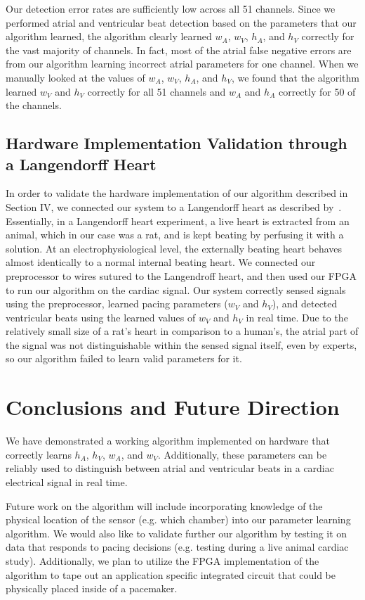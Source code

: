 \documentclass[conference]{IEEEtran}
\newcommand{\APW}{\ensuremath{w_A}}
\newcommand{\VPW}{\ensuremath{w_V}}
\newcommand{\APH}{\ensuremath{h_A}}
\newcommand{\VPH}{\ensuremath{h_V}}
\begin{document}
Our detection error rates are sufficiently low across 
all 51 channels. Since we performed atrial and
ventricular beat detection based on the parameters that
our algorithm learned, the algorithm clearly learned
\APW{}, \VPW{}, \APH{}, and \VPH{} correctly for the vast
majority of channels. In fact, most of the atrial false negative
errors are from our algorithm learning incorrect
atrial parameters for one channel. When we manually
looked at the values of \APW{}, \VPW{}, \APH{}, and \VPH{}, we
found that the algorithm learned \VPW{} and \VPH{} correctly
for all 51 channels and \APW{} and \APH{} correctly for 50 of 
the channels.

\subsection{Hardware Implementation Validation through a Langendorff Heart}
In order to validate the hardware implementation of
our algorithm described in Section IV, we connected our 
system to a Langendorff heart as described by~\cite{langendorff}.
Essentially, in a Langendorff heart experiment, a live
heart is extracted from an animal, which in our case was
a rat, and is kept beating by perfusing it with a solution. 
At an electrophysiological level, the externally beating heart behaves almost identically to a normal internal beating heart.
We connected our preprocessor to wires
sutured to the Langendroff heart, and then used our
FPGA to run our algorithm on the cardiac signal.
Our system correctly sensed signals using
the preprocessor, learned pacing parameters (\VPW{} and
\VPH{}), and detected ventricular beats using the learned
values of \VPW{} and \VPH{} in real time. Due to the
relatively small size of a rat's heart in comparison to a
human's, the atrial part of the signal was not
distinguishable within the sensed signal itself, even by experts,
so our algorithm failed to learn valid parameters for it.

\section{Conclusions and Future Direction}
We have demonstrated a working algorithm
implemented on hardware that correctly learns \APH{},
\VPH{}, \APW{}, and \VPW{}. Additionally, these parameters
can be reliably used to distinguish between atrial and
ventricular beats in a cardiac electrical signal in real time.

Future work on the algorithm will include
	incorporating knowledge of the physical location of the sensor (e.g. which chamber) into our parameter learning algorithm.
We would also like to validate further our algorithm by testing it on data that responds to pacing decisions (e.g. testing during a live animal cardiac study).
Additionally, we plan to utilize the FPGA implementation of
the algorithm to tape out an application specific
integrated circuit that could be physically placed inside
of a pacemaker.
\end{document}
